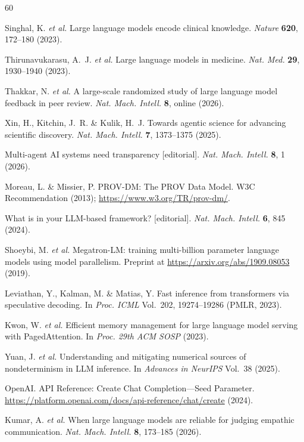 \documentclass[sn-nature]{sn-jnl}
\begin{document}
\begin{thebibliography}{60}

Singhal, K. \emph{et al.}
Large language models encode clinical knowledge.
\emph{Nature} \textbf{620}, 172--180 (2023).

Thirunavukarasu, A.~J. \emph{et al.}
Large language models in medicine.
\emph{Nat. Med.} \textbf{29}, 1930--1940 (2023).

Thakkar, N. \emph{et al.}
A large-scale randomized study of large language model feedback in peer review.
\emph{Nat. Mach. Intell.} \textbf{8}, online (2026).

Xin, H., Kitchin, J.~R. \& Kulik, H.~J.
Towards agentic science for advancing scientific discovery.
\emph{Nat. Mach. Intell.} \textbf{7}, 1373--1375 (2025).

Multi-agent AI systems need transparency [editorial].
\emph{Nat. Mach. Intell.} \textbf{8}, 1 (2026).

Moreau, L. \& Missier, P.
PROV-DM: The PROV Data Model.
W3C Recommendation (2013); \url{https://www.w3.org/TR/prov-dm/}.

What is in your LLM-based framework? [editorial].
\emph{Nat. Mach. Intell.} \textbf{6}, 845 (2024).

Shoeybi, M. \emph{et al.}
Megatron-LM: training multi-billion parameter language models using model parallelism.
Preprint at \url{https://arxiv.org/abs/1909.08053} (2019).

Leviathan, Y., Kalman, M. \& Matias, Y.
Fast inference from transformers via speculative decoding.
In \emph{Proc. ICML} Vol.~202, 19274--19286 (PMLR, 2023).

Kwon, W. \emph{et al.}
Efficient memory management for large language model serving with PagedAttention.
In \emph{Proc. 29th ACM SOSP} (2023).

Yuan, J. \emph{et al.}
Understanding and mitigating numerical sources of nondeterminism in LLM inference.
In \emph{Advances in NeurIPS} Vol.~38 (2025).

OpenAI. API Reference: Create Chat Completion---Seed Parameter.
\url{https://platform.openai.com/docs/api-reference/chat/create} (2024).

Kumar, A. \emph{et al.}
When large language models are reliable for judging empathic communication.
\emph{Nat. Mach. Intell.} \textbf{8}, 173--185 (2026).


\end{thebibliography}
\end{document}

